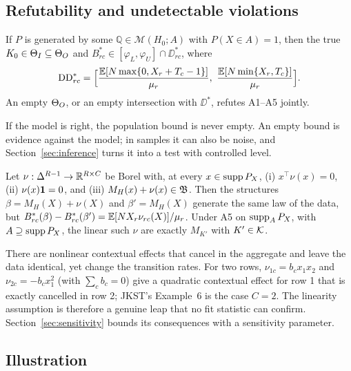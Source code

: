 \subsection{Refutability and undetectable violations}

\begin{proposition}\label{prop:nonempty}
If $P$ is generated by some $\mathbb Q\in\mathcal M(H_0;A)$ with $P(X\in A)=1$,
then the true $K_0\in\Theta_I\subseteq\Theta_O$ and
$B^*_{rc}\in[\varphi_L,\varphi_U]\cap\DD^*_{rc}$, where
\[
\DD^*_{rc}=\Big[\frac{\E[N\max\{0,X_r+T_c-1\}]}{\mu_r},\ \frac{\E[N\min\{X_r,T_c\}]}{\mu_r}\Big].
\]
An empty $\Theta_O$, or an empty intersection with $\DD^*$, refutes A1--A5 jointly.
\end{proposition}
\begin{reading}
If the model is right, the population bound is never empty. An empty bound is
evidence against the model; in samples it can also be noise, and
Section~\ref{sec:inference} turns it into a test with controlled level.
\end{reading}

\begin{proposition}\label{prop:undetectable}
Let $\nu:\Delta^{R-1}\to\mathbb R^{R\times C}$ be Borel with, at every $x\in\operatorname{supp} P_X$,
(i) $x^\top\nu(x)=0$, (ii) $\nu(x)\mathbf 1=0$, and (iii) $M_H(x)+\nu(x)\in\mathfrak B$. Then
the structures $\beta=M_H(X)+\nu(X)$ and $\beta'=M_H(X)$ generate the same law of
the data, but
$B^*_{rc}(\beta)-B^*_{rc}(\beta')=\mathbb E[NX_r\nu_{rc}(X)]/\mu_r$. Under A5 on $\operatorname{supp}_AP_X$, with $A\supseteq\operatorname{supp} P_X$, the linear
such $\nu$ are exactly $M_{K'}$ with $K'\in\mathcal K$.
\end{proposition}
\begin{reading}
There are nonlinear contextual effects that cancel in the aggregate and leave the
data identical, yet change the transition rates. For two rows, $\nu_{1c}=b_cx_1x_2$
and $\nu_{2c}=-b_cx_1^2$ (with $\sum_cb_c=0$) give a quadratic contextual effect
for row 1 that is exactly cancelled in row 2; JKST's Example~6 is the case $C=2$.
The linearity assumption is therefore a genuine leap that no fit statistic can
confirm. Section~\ref{sec:sensitivity} bounds its consequences with a
sensitivity parameter.
\end{reading}

\subsection{Illustration}

